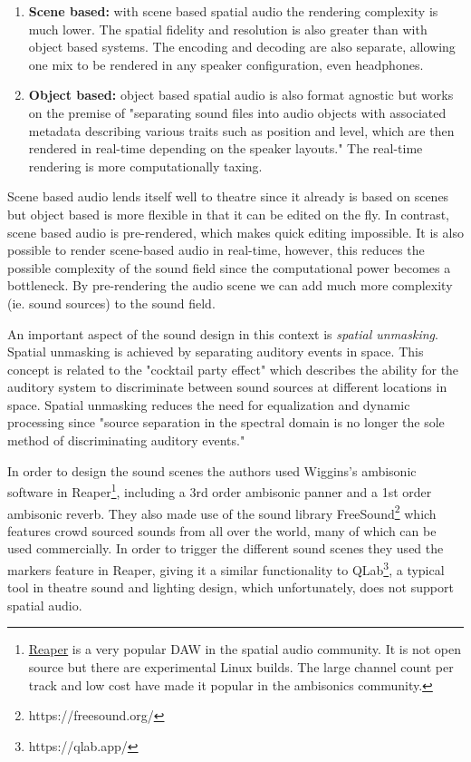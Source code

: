 \begin{enumerate}
    \item \textbf{Scene based:} with scene based spatial audio the rendering complexity is much lower. The spatial fidelity and resolution is also greater than with object based systems. The encoding and decoding are also separate, allowing one mix to be rendered in any speaker configuration, even headphones. 
    \item \textbf{Object based:} object based spatial audio is also format agnostic but works on the premise of "separating sound files into audio objects with  associated metadata describing various traits such as position and level, which are then rendered in real-time depending on the speaker layouts." The real-time rendering is more computationally taxing. 
\end{enumerate}

Scene based audio lends itself well to theatre since it already is based on scenes but object based is more flexible in that it can be edited on the fly. In contrast, scene based audio is pre-rendered, which makes quick editing impossible. It is also possible to render scene-based audio in real-time, however, this reduces the possible complexity of the sound field since the computational power becomes a bottleneck. By pre-rendering the audio scene we can add much more complexity (ie. sound sources) to the sound field. 

An important aspect of the sound design in this context is \textit{spatial unmasking}. Spatial unmasking is achieved by separating auditory events in space. This concept is related to the "cocktail party effect" which describes the ability for the auditory system to discriminate between sound sources at different locations in space. Spatial unmasking reduces the need for equalization and dynamic processing since "source separation in the spectral domain is no longer the sole method of discriminating auditory events.\cite{vilkaitis2019ambisonic}" 

In order to design the sound scenes the authors used Wiggins's ambisonic software in Reaper\footnote{\href{https://www.reaper.fm/}{Reaper} is a very popular DAW in the spatial audio community. It is not open source but there are experimental Linux builds. The large channel count per track and low cost have made it popular in the ambisonics community.}, including a 3rd order ambisonic panner and a 1st order ambisonic reverb\cite{wiggins2016ambifreeverb}. They also made use of the sound library FreeSound\footnote{https://freesound.org/} which features crowd sourced sounds from all over the world, many of which can be used commercially. In order to trigger the different sound scenes they used the markers feature in Reaper, giving it a similar functionality to QLab\footnote{https://qlab.app/}, a typical tool in theatre sound and lighting design, which unfortunately, does not support spatial audio. 


